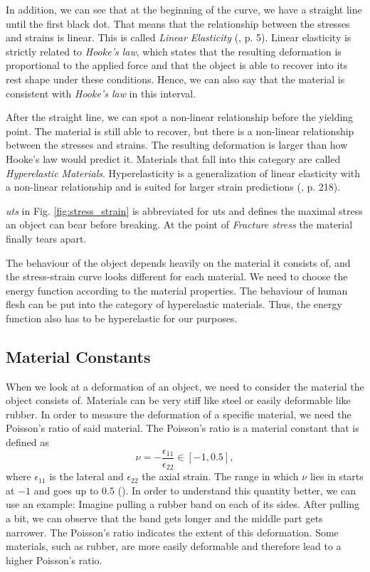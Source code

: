 In addition, we can see that at the beginning of the curve, we have a straight line until the first black dot. That means that the relationship between the stresses and strains is linear. This is called \textit{Linear Elasticity} (\cite{KORSUNSKY20175}, p. 5). Linear elasticity is strictly related to \textit{Hooke's law}, which states that the resulting deformation is proportional to the applied force and that the object is able to recover into its rest shape under these conditions. Hence, we can also say that the material is consistent with \textit{Hooke's law} in this interval.

After the straight line, we can spot a non-linear relationship before the yielding point. The material is still able to recover, but there is a non-linear relationship between the stresses and strains. The resulting deformation is larger than how Hooke's law would predict it. Materials that fall into this category are called \textit{Hyperelastic Materials}. Hyperelasticity is a generalization of linear elasticity with a non-linear relationship and is suited for larger strain predictions (\cite{BERGSTROM2015209}, p. 218).

\textit{\acrshort{uts}} in Fig. \ref{fig:stress_strain} is abbreviated for \acrlong{uts} and defines the maximal stress an object can bear before breaking. At the point of \textit{Fracture stress} the material finally tears apart.

The behaviour of the object depends heavily on the material it consists of, and the stress-strain curve looks different for each material. We need to choose the energy function according to the material properties. The behaviour of human flesh can be put into the category of hyperelastic materials. Thus, the energy function also has to be hyperelastic for our purposes. 

\subsection{Material Constants}
\label{ss:material_constants}
When we look at a deformation of an object, we need to consider the material the object consists of. Materials can be very stiff like steel or easily deformable like rubber. In order to measure the deformation of a specific material, we need the Poisson's ratio of said material. The Poisson's ratio is a material constant that is defined as 
\begin{equation}\label{eq:poisson}
\nu = - \frac{\epsilon_{11}}{\epsilon_{22}} \in [-1, 0.5],
\end{equation}
where $\epsilon_{11}$ is the lateral and $\epsilon_{22}$ the axial strain. The range in which $\nu$ lies in starts at $-1$ and goes up to $0.5$ (\cite{PhysRevB.80.132104}). In order to understand this quantity better, we can use an example: Imagine pulling a rubber band on each of its sides. After pulling a bit, we can observe that the band gets longer and the middle part gets narrower. The Poisson's ratio indicates the extent of this deformation. Some materials, such as rubber, are more easily deformable and therefore lead to a higher Poisson's ratio.


